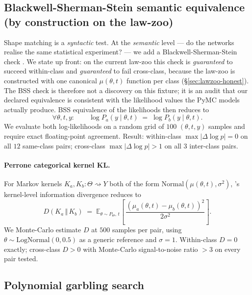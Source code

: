 \documentclass{article}
\begin{document}
\subsection{Blackwell-Sherman-Stein semantic equivalence
(by construction on the law-zoo)}
\label{sec:bss-perrone}

Shape matching is a \emph{syntactic} test. At the \emph{semantic}
level --- do the networks realise the same statistical experiment?
--- we add a Blackwell-Sherman-Stein check
\citep{blackwell1953equivalent, fritz2020synthetic}. We state up
front: on the current law-zoo this check is \emph{guaranteed} to
succeed within-class and \emph{guaranteed} to fail cross-class,
because the law-zoo is constructed with one canonical
$\mu(\theta, t)$ function per class
(\S\ref{sec:lawzoo-honest}). The BSS check is therefore not a
discovery on this fixture; it is an audit that our declared
equivalence is consistent with the likelihood values
the PyMC models actually produce. BSS equivalence of the likelihoods
then reduces to
\begin{equation}
\forall \theta, t, y:\qquad
\log P_{a}(y \mid \theta, t) \;=\; \log P_{b}(y \mid \theta, t).
\end{equation}
We evaluate both log-likelihoods on a random grid of $100$
$(\theta, t, y)$ samples and require exact floating-point agreement.
Result: within-class $\max|\Delta \log p| = 0$ on all $12$ same-class
pairs; cross-class $\max|\Delta \log p| > 1$ on all $3$ inter-class
pairs.

\paragraph{Perrone categorical kernel KL.}
For Markov kernels $K_{a}, K_{b} : \Theta \rightsquigarrow Y$ both of
the form $\mathrm{Normal}(\mu(\theta, t), \sigma^{2})$,
\citet{perrone2024catinfogeom}'s kernel-level information divergence
reduces to
\begin{equation}
D(K_{a} \,\Vert\, K_{b}) \;=\;
\mathbb{E}_{\theta \sim P_{\Theta},\, t}\!\left[\,
\frac{(\mu_{a}(\theta, t) - \mu_{b}(\theta, t))^{2}}{2 \sigma^{2}}
\right].
\label{eq:perrone-kl}
\end{equation}
We Monte-Carlo estimate $D$ at $500$ samples per pair, using
$\theta \sim \mathrm{LogNormal}(0, 0.5)$ as a generic reference and
$\sigma = 1$. Within-class $D = 0$ exactly; cross-class $D > 0$ with
Monte-Carlo signal-to-noise ratio $> 3$ on every pair tested.

\subsection{Polynomial garbling search}
\label{sec:garbling}
\end{document}
